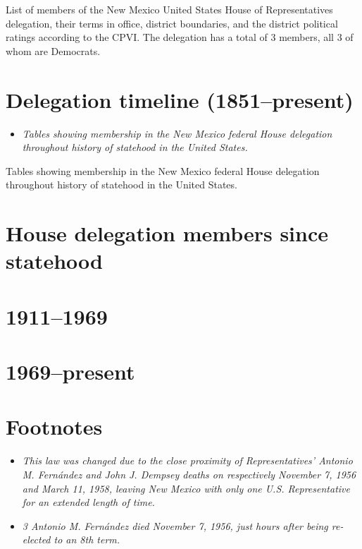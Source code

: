 List of members of the New Mexico United States House of Representatives
delegation, their terms in office, district boundaries, and the district
political ratings according to the CPVI. The delegation has a total of 3
members, all 3 of whom are Democrats.

\section{Delegation timeline
(1851--present)}\label{delegation-timeline-1851present}

\begin{itemize}
\item
  \emph{Tables showing membership in the New Mexico federal House
  delegation throughout history of statehood in the United States.}
\end{itemize}

Tables showing membership in the New Mexico federal House delegation
throughout history of statehood in the United States.

\section{House delegation members since
statehood}\label{house-delegation-members-since-statehood}

\section{1911--1969}\label{section}

\section{1969--present}\label{present}

\section{Footnotes}\label{footnotes}

\begin{itemize}
\item
  \emph{This law was changed due to the close proximity of
  Representatives' Antonio M. Fernández and John J. Dempsey deaths on
  respectively November 7, 1956 and March 11, 1958, leaving New Mexico
  with only one U.S. Representative for an extended length of time.}
\item
  \emph{3 Antonio M. Fernández died November 7, 1956, just hours after
  being re-elected to an 8th term.}
\end{itemize}

